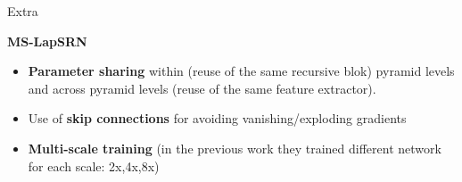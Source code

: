 \documentclass[
    xcolor={svgnames},
    hyperref={colorlinks,citecolor=OrangeRed,linkcolor=OrangeRed,urlcolor=DarkBlue}
    ]{beamer}
\begin{document}
\begin{frame}{Extra}
{        \textbf{MS-LapSRN}
        \begin{itemize}
            \tiny
            \item \textbf{Parameter sharing} within (reuse of the same recursive blok) pyramid levels and across pyramid levels (reuse of the same feature extractor).
            \item Use of \textbf{skip connections} for avoiding vanishing/exploding gradients
            \item \textbf{Multi-scale training} (in the previous work they trained different network for each scale: 2x,4x,8x)
        \end{itemize}
    }   
\end{frame}
\end{document}
